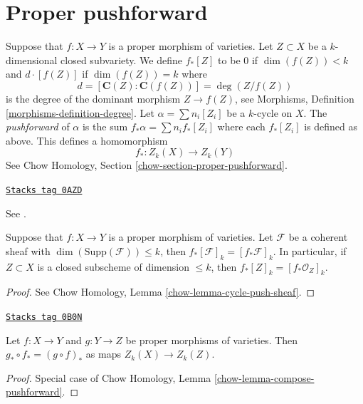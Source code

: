 \section{Proper pushforward}
\label{intersection-section-pushforward}
Suppose that $f : X \to Y$ is a proper morphism of varieties.
Let $Z \subset X$ be a $k$-dimensional
closed subvariety. We define $f_*[Z]$ to be $0$ if $\dim(f(Z)) < k$
and $d \cdot [f(Z)]$ if $\dim(f(Z)) = k$ where
$$
d = [\mathbf{C}(Z) : \mathbf{C}(f(Z))] = \deg(Z/f(Z))
$$
is the degree of the dominant morphism $Z \to f(Z)$, see
Morphisms, Definition \ref{morphisms-definition-degree}.
Let $\alpha = \sum n_i [Z_i]$ be a $k$-cycle on $X$. The
{\it pushforward} of $\alpha$ is the sum $f_* \alpha = \sum n_i f_*[Z_i]$
where each $f_*[Z_i]$ is defined as above. This defines a homomorphism
$$
f_* : Z_k(X) \longrightarrow Z_k(Y)
$$
See Chow Homology, Section \ref{chow-section-proper-pushforward}.

\begin{lemma}
\label{intersection-lemma-push-coherent}
\href{https://stacks.math.columbia.edu/tag/0AZD}{\texttt{Stacks tag 0AZD}}

\begin{reference}
See \cite[Chapter V]{Serre_algebre_locale}.
\end{reference}
Suppose that $f : X \to Y$ is a proper morphism of varieties.
Let $\mathcal{F}$ be a coherent sheaf with
$\dim(\text{Supp}(\mathcal{F})) \leq k$, then
$f_*[\mathcal{F}]_k = [f_*\mathcal{F}]_k$. In particular, if
$Z \subset X$ is a closed subscheme of dimension $\leq k$, then
$f_*[Z]_k = [f_*\mathcal{O}_Z]_k$.
\end{lemma}

\begin{proof}
See Chow Homology, Lemma \ref{chow-lemma-cycle-push-sheaf}.
\end{proof}

\begin{lemma}
\label{intersection-lemma-compose-pushforward}
\href{https://stacks.math.columbia.edu/tag/0B0N}{\texttt{Stacks tag 0B0N}}

Let $f : X \to Y$ and $g : Y \to Z$ be proper morphisms of
varieties. Then $g_* \circ f_* = (g \circ f)_*$ as maps $Z_k(X) \to Z_k(Z)$.
\end{lemma}

\begin{proof}
Special case of Chow Homology, Lemma \ref{chow-lemma-compose-pushforward}.
\end{proof}

